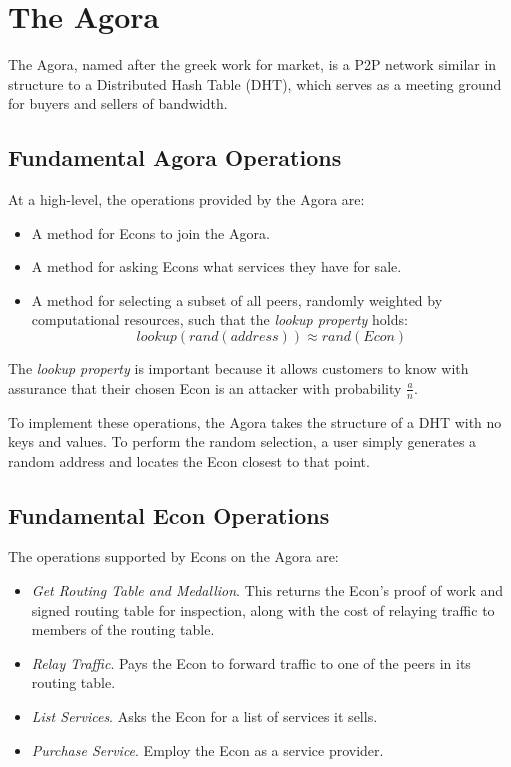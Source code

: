 \documentclass{article}
\begin{document}
\section{The Agora}
\label{sec:agora}

The Agora, named after the greek work for market, is a P2P network
similar in structure to a Distributed Hash Table (DHT), which serves
as a meeting ground for buyers and sellers of bandwidth.

\subsection{Fundamental Agora Operations}

At a high-level, the operations provided by the Agora are:

\begin{itemize}
\item A method for Econs to join the Agora.
\item A method for asking Econs what services they have for sale.
\item A method for selecting a subset of all peers, randomly weighted by computational resources, such that the \emph{lookup property} holds: $$lookup(rand(address)) \approx rand(Econ)$$
\end{itemize}

The \emph{lookup property} is important because it allows customers to
know with assurance that their chosen Econ is an attacker with
probability $\frac{a}{n}$.

To implement these operations, the Agora takes the structure of a DHT
with no keys and values. To perform the random selection, a user
simply generates a random address and locates the Econ closest to that
point.

\subsection{Fundamental Econ Operations}

The operations supported by Econs on the Agora are:

\begin{itemize}
\item \emph{Get Routing Table and Medallion}. This returns the Econ's proof of work and signed routing table for inspection, along with the cost of relaying traffic to members of the routing table.
\item \emph{Relay Traffic}. Pays the Econ to forward traffic to one of the peers in its routing table.
\item \emph{List Services}. Asks the Econ for a list of services it sells.
\item \emph{Purchase Service}. Employ the Econ as a service provider.
\end{itemize}
\end{document}
